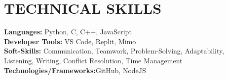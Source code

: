 \documentclass[letterpaper,11pt]{article}
\makeatletter
\newcommand{\resumeItem}[1]{
  \item\small{
    {#1 \vspace{-3pt}}
  }
}
\newcommand{\resumeSubheading}[4]{
  \vspace{-2pt}\item
    \begin{tabular*}{1.0\textwidth}[t]{l@{\extracolsep{\fill}}r}
      \textbf{\large#1} & \textbf{\small #2} \\
      \textit{\large#3} & \textit{\small #4} \\
     
    \end{tabular*}\vspace{-9pt}
}
\newcommand{\resumeProjectHeading}[2]{
    \item
    \begin{tabular*}{1.001\textwidth}{l@{\extracolsep{\fill}}r}
      \small#1 & \textbf{\small #2}\\
    \end{tabular*}\vspace{-9pt}
}
\newcommand{\resumeSubHeadingListStart}{\begin{itemize}[leftmargin=0.0in, label={}]}
\newcommand{\resumeSubHeadingListEnd}{\end{itemize}}
\newcommand{\resumeItemListStart}{\begin{itemize}}
\newcommand{\resumeItemListEnd}{\end{itemize}\vspace{-5pt}}
\makeatother
\begin{document}
           
         









 
\section{TECHNICAL SKILLS}
 \begin{itemize}[leftmargin=0.25in, label={}]
    \small{\item{
     \textbf{\normalsize{Languages:}}{ \normalsize{Python, C, C++, JavaScript}} \\
     \textbf{\normalsize{Developer Tools:}}{ \normalsize{VS Code,  Replit, Mimo}} \\
      \textbf{\normalsize{Soft-Skills:}}{ \normalsize{Communication, Teamwork, Problem-Solving, Adaptability, Listening, Writing, Conflict Resolution, Time Management}} \\
     \textbf{\normalsize{Technologies/Frameworks:}}{\normalsize{GitHub, NodeJS}} \\
    }}
 \end{itemize}
 \vspace{-25pt}
\end{document}
